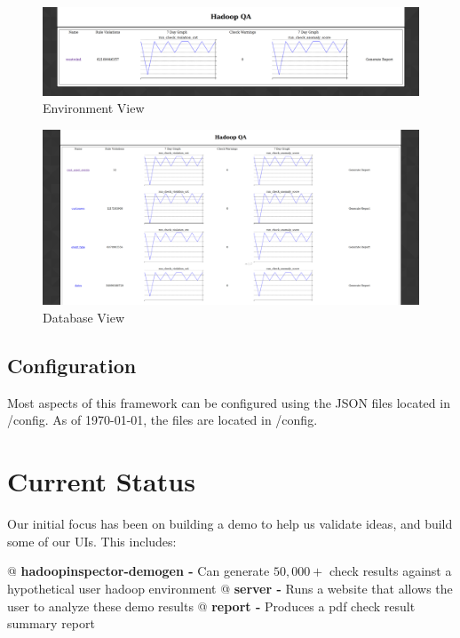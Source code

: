     \begin{figure}[H]
        \centering
        \includegraphics[scale=0.2]{./img/prod.png}
        \caption{Environment View}
    \end{figure}

    \begin{figure}[H]
        \centering
        \includegraphics[scale=0.2]{./img/westwind.png}
        \caption{Database View}
    \end{figure}

    \subsection{Configuration}
    Most aspects of this framework can be configured using the JSON files located in {\ttfamily /config}. As of \today,
    the files are located in {\ttfamily /config}.

\section{Current Status}
Our initial focus has been on building a demo to help us validate ideas, and build some of our UIs. This includes:

\begin{easylist}[itemize]
    @ \textbf{hadoopinspector-demogen -} Can generate $50,000+$ check results against a hypothetical user hadoop environment
    @ \textbf{server -} Runs a website that allows the user to analyze these demo results
    @ \textbf{report -} Produces a pdf check result summary report
\end{easylist}

